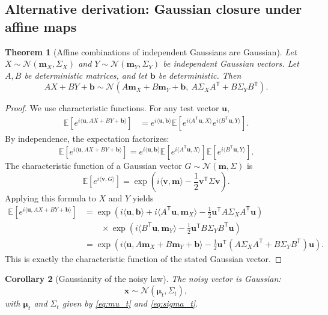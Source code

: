 \documentclass[11pt]{article}
\numberwithin{equation}{section}
\newtheorem{theorem}{Theorem}[section]
\newtheorem{corollary}[theorem]{Corollary}
\theoremstyle{definition}
\theoremstyle{remark}
\newcommand{\E}{\mathbb{E}}
\newcommand{\trans}{\mathsf{T}}
\newcommand{\Ncal}{\mathcal{N}}
\newcommand{\inner}[2]{\langle #1,#2\rangle}
\begin{document}
\subsection{Alternative derivation: Gaussian closure under affine maps}

\begin{theorem}[Affine combinations of independent Gaussians are Gaussian]\label{thm:gaussian_closure}
Let $X\sim\Ncal(\mathbf m_X,\Sigma_X)$ and $Y\sim \Ncal(\mathbf m_Y,\Sigma_Y)$ be independent Gaussian vectors. Let $A,B$ be deterministic matrices, and let $\mathbf b$ be deterministic. Then
\[
AX+BY+\mathbf b
\sim
\Ncal(A\mathbf m_X+B\mathbf m_Y+\mathbf b,\ A\Sigma_XA^\trans+B\Sigma_YB^\trans).
\]
\end{theorem}

\begin{proof}
We use characteristic functions. For any test vector $\mathbf u$,
\begin{align*}
\E\!\left[e^{i\inner{\mathbf u}{AX+BY+\mathbf b}}\right]
&=
e^{i\inner{\mathbf u}{\mathbf b}}
\E\!\left[e^{i\inner{A^\trans\mathbf u}{X}}e^{i\inner{B^\trans\mathbf u}{Y}}\right].
\end{align*}
By independence, the expectation factorizes:
\[
\E\!\left[e^{i\inner{\mathbf u}{AX+BY+\mathbf b}}\right]
=
e^{i\inner{\mathbf u}{\mathbf b}}
\E\!\left[e^{i\inner{A^\trans\mathbf u}{X}}\right]
\E\!\left[e^{i\inner{B^\trans\mathbf u}{Y}}\right].
\]
The characteristic function of a Gaussian vector $G\sim\Ncal(\mathbf m,\Sigma)$ is
\[
\E[e^{i\inner{\mathbf v}{G}}]
=
\exp\!\left(i\inner{\mathbf v}{\mathbf m}-\frac12\mathbf v^\trans\Sigma\mathbf v\right).
\]
Applying this formula to $X$ and $Y$ yields
\begin{align*}
\E\!\left[e^{i\inner{\mathbf u}{AX+BY+\mathbf b}}\right]
&=
\exp\!\left(
i\inner{\mathbf u}{\mathbf b}
+i\inner{A^\trans\mathbf u}{\mathbf m_X}
-\frac12\mathbf u^\trans A\Sigma_XA^\trans\mathbf u
\right)\\
&\qquad\times
\exp\!\left(
i\inner{B^\trans\mathbf u}{\mathbf m_Y}
-\frac12\mathbf u^\trans B\Sigma_YB^\trans\mathbf u
\right)\\
&=
\exp\!\left(
i\inner{\mathbf u}{A\mathbf m_X+B\mathbf m_Y+\mathbf b}
-\frac12\mathbf u^\trans(A\Sigma_XA^\trans+B\Sigma_YB^\trans)\mathbf u
\right).
\end{align*}
This is exactly the characteristic function of the stated Gaussian vector.
\end{proof}

\begin{corollary}[Gaussianity of the noisy law]\label{cor:xt_gaussian}
The noisy vector is Gaussian:
\[
\mathbf x\sim \Ncal(\boldsymbol{\mu}_t,\Sigma_t),
\]
with $\boldsymbol{\mu}_t$ and $\Sigma_t$ given by \eqref{eq:mu_t} and \eqref{eq:sigma_t}.
\end{corollary}
\end{document}

